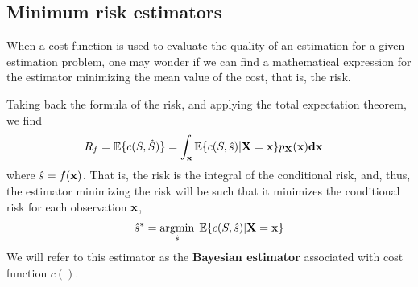 \subsection{Minimum risk estimators}

When a cost function is used to evaluate the quality of an estimation for a given estimation problem, one may wonder if we can find a mathematical expression for the estimator minimizing the mean value of the cost, that is, the risk.

{Taking back the formula of the risk, and applying the total expectation theorem, we find
\begin{align}
\label{ec:coste_medio}
R_f = \mathbb{E}\{c(S,\hat S)\} 
  & = \int_{\bf x} \mathbb{E}\{c(S,\hat s)|{\bf X} = {\bf x} \} 
               p_{\bf X}(\bf x) d{\bf x}
\end{align}
where $\hat s= f({\bf x})$. That is, the risk is the integral of the conditional risk, and, thus, the estimator minimizing the risk will be such that it minimizes the conditional risk for each observation ${\bf x}$,}
\begin{equation}
\label{ec:est_bayesiano}
{\hat s}^* = \operatorname*{argmin}_{\hat s}\;\mathbb{E}\{c(S,\hat s)|{\bf X} = {\bf x} \}
\end{equation}
We will refer to this estimator as the \textbf{Bayesian estimator} associated with cost function $c()$. 


